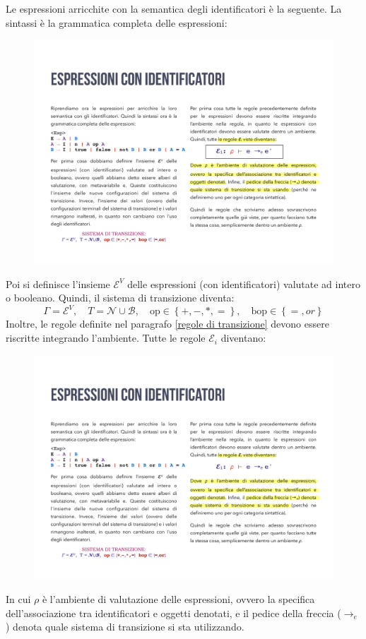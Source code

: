 \documentclass[a4paper]{article}
\begin{document}
	Le espressioni arricchite con la semantica degli identificatori è la seguente. La sintassi è la grammatica completa delle espressioni:
	\begin{figure}[!htp]
		\centering
		\includegraphics[width=.8\textwidth]{img/espressioni-identificatori.pdf}
	\end{figure}
	
	\noindent
	Poi si definisce l'insieme $\mathcal{E}^{V}$ delle espressioni (con identificatori) valutate ad intero o booleano. Quindi, il sistema di transizione diventa:
	\begin{equation*}
		\Gamma = \mathcal{E}^{V}, \hspace{1em} T = \mathcal{N} \cup \mathcal{B}, \hspace{1em} \mathrm{op} \in \left\{+,-,*,=\right\}, \hspace{1em} \mathrm{bop} \in \left\{=, or\right\}
	\end{equation*}
	Inoltre, le regole definite nel paragrafo \ref{regole di transizione} devono essere riscritte integrando l'ambiente. Tutte le regole $\mathcal{E}_{i}$ diventano:
	\begin{figure}[!htp]
		\centering
		\includegraphics[width=.4\textwidth]{img/regole_arricchite.pdf}
	\end{figure}

	\noindent
	In cui $\rho$ è l'ambiente di valutazione delle espressioni, ovvero la specifica dell'associazione tra identificatori e oggetti denotati, e il pedice della freccia ($\rightarrow_{e}$) denota quale sistema di transizione si sta utilizzando.\newpage
	
\end{document}
